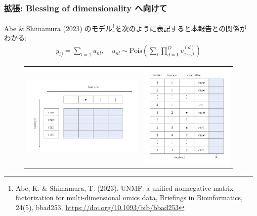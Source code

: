 \documentclass[dvipdfmx, dvipsnames]{beamer}
\begin{document}
\begin{frame}
\frametitle{拡張: Blessing of dimensionality へ向けて}
Abe \& Shimamura (2023) のモデル\footnote{Abe, K. \& Shimamura, T. (2023). UNMF: a unified nonnegative matrix factorization for multi-dimensional omics data, Briefings in Bioinformatics, 24(5), bbad253, \url{https://doi.org/10.1093/bib/bbad253}}を次のように表記すると本報告との関係がわかる:
\begin{align*}
y_{ij} = \sum_{l=1}u_{nl}, \quad u_{nl} \sim \mathrm{Pois} \left(\sum_{l} \prod_{d=1}^D v^{(d)}_{x_{nd}, l}\right) 
\end{align*}

\begin{figure}
\begin{tabular}{cc}
\includegraphics[height=0.45\textheight]{img/anndata}
&
\includegraphics[height=0.45\textheight]{img/anndata_tidy}
\end{tabular}
\end{figure}
\end{frame}
\end{document}

